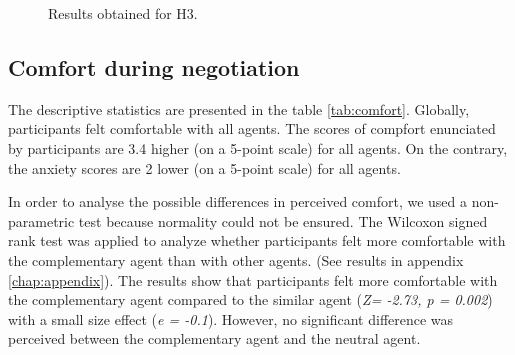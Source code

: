 \documentclass[10pt, a4paper, twocolumn]{article} %
\begin{document}
		
		\begin{figure}[!tbh]
			
			
			
			\caption{Results obtained for H3.}
			\label{fig:tour}
		\end{figure}
%	
	
	\subsection{Comfort during negotiation}
	
	The descriptive statistics are presented in the table \ref{tab:comfort}. Globally, participants felt comfortable with all agents.
	The scores of compfort enunciated by participants are 3.4 higher (on a 5-point scale) for all agents. On the contrary, the anxiety scores are 2 lower (on a 5-point scale) for all agents. 
	
	In order to analyse the possible differences in perceived comfort, we used a non-parametric test because normality could not be ensured. The Wilcoxon signed rank test was applied to analyze whether participants felt more comfortable with the complementary agent than with other agents. (See results in appendix \ref{chap:appendix}). 
	The results show that participants felt more comfortable with the complementary agent compared to the similar agent (\emph{Z= -2.73, p = 0.002})
	with a small size effect (\emph{e = -0.1}). However, no significant difference was perceived between the complementary agent and the neutral agent. 
	
\end{document}
